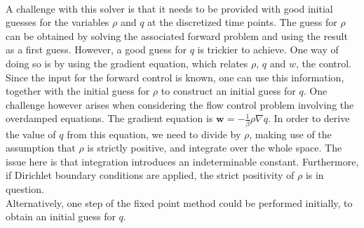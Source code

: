 \documentclass[11pt, a4paper]{article}
\theoremstyle{definition}
\newcommand{\adj}{q}
\begin{document}
\\
A challenge with this solver is that it needs to be provided with good initial guesses for the variables $\rho$ and $\adj$ at the discretized time points. The guess for $\rho$ can be obtained by solving the associated forward problem and using the result as a first guess. However, a good guess for $\adj$ is trickier to achieve. One way of doing so is by using the gradient equation, which relates $\rho$, $\adj$ and $w$, the control. Since the input for the forward control is known, one can use this information, together with the initial guess for $\rho$ to construct an initial guess for $\adj$. 
One challenge however arises when considering the flow control problem involving the overdamped equations. The gradient equation is $\mathbf{w} = - \frac{1}{\beta} \rho\nabla \adj$. In order to derive the value of $\adj$ from this equation, we need to divide by $\rho$, making use of the assumption that $\rho$ is strictly positive, and integrate over the whole space. The issue here is that integration introduces an indeterminable constant. Furthermore, if Dirichlet boundary conditions are applied, the strict positivity of $\rho$ is in question.\\
Alternatively, one step of the fixed point method could be performed initially, to obtain an initial guess for $\adj$. 
\end{document}
